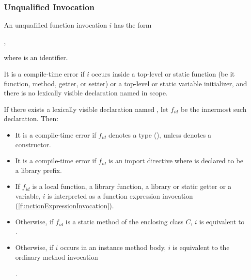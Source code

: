 \documentclass[makeidx]{article}
\begin{document}
\subsubsection{Unqualified Invocation}

\LMHash{}%
An unqualified function invocation $i$ has the form

,

\noindent
where \id{} is an identifier.


\LMHash{}%
It is a compile-time error if $i$ occurs inside a top-level or static function
(be it function, method, getter, or setter)
or a top-level or static variable initializer,
and there is no lexically visible declaration named \id{} in scope.

\LMHash{}%
If there exists a lexically visible declaration named \id,
let $f_{id}$ be the innermost such declaration.
Then:
\begin{itemize}
\item It is a compile-time error if $f_{id}$ denotes a type
  (),
  unless \id{} denotes a constructor.
\item It is a compile-time error if $f_{id}$ is an import directive
  where \id{} is declared to be a library prefix.
\item
If $f_{id}$ is
a local function,
a library function,
a library or static getter or a variable,
$i$ is interpreted as a function expression invocation
(\ref{functionExpressionInvocation}).
\item
Otherwise, if $f_{id}$ is a static method of the enclosing class $C$,
$i$ is equivalent to
.
\item Otherwise, if $i$ occurs in an instance method body,
$i$ is equivalent to the ordinary method invocation

.
\end{itemize}

\end{document}
